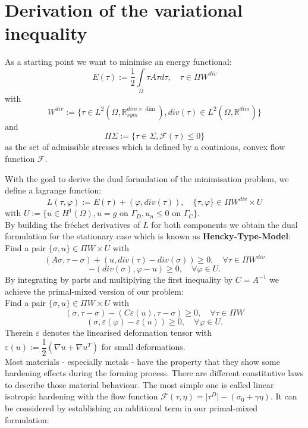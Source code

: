 \documentclass{article}
\begin{document}
\section{Derivation of the variational inequality}

As a starting point we want to minimise an energy functional:
$$E(\tau) := \dfrac{1}{2}\int\limits_{\Omega}\tau A \tau d\tau,\quad \tau\in \Pi W^{div}$$
with
$$W^{div}:=\lbrace \tau\in L^2(\Omega,\mathbb{R}^{dim\times\dim}_{sym}),div(\tau)\in L^2(\Omega,\mathbb{R}^{dim})\rbrace$$
and
$$\Pi \Sigma:=\lbrace \tau\in \Sigma, \mathcal{F}(\tau)\leq 0\rbrace$$
as the set of admissible stresses which is defined
by a continious, convex flow function $\mathcal{F}$.

With the goal to derive the dual formulation of the minimisation problem, we define a lagrange function:
$$L(\tau,\varphi) := E(\tau) + (\varphi, div(\tau)),\quad \lbrace\tau,\varphi\rbrace\in\Pi W^{div}\times U$$
with $U := \lbrace u\in H^1(\Omega), u = g \text{ on } \Gamma_D,u_n\leq 0 \text{ on } \Gamma_C \rbrace$.\\
By building the fr\'echet derivatives of $L$ for both components we obtain the dual formulation for the stationary case
which is known as \textbf{Hencky-Type-Model}:\\
Find a pair $\lbrace\sigma,u\rbrace\in \Pi W\times U$ with
$$\left(A\sigma,\tau - \sigma\right) + \left(u, div(\tau) - div(\sigma)\right) \geq 0,\quad \forall \tau\in \Pi W^{div}$$
$$-\left(div(\sigma),\varphi - u\right) \geq 0,\quad \forall \varphi\in U.$$
By integrating by parts and multiplying the first inequality by $C=A^{-1}$  we achieve the primal-mixed version of our problem:\\
Find a pair $\lbrace\sigma,u\rbrace\in \Pi W\times U$ with
$$\left(\sigma,\tau - \sigma\right) - \left(C\varepsilon(u), \tau - \sigma\right) \geq 0,\quad \forall \tau\in \Pi W$$
$$\left(\sigma,\varepsilon(\varphi) - \varepsilon(u)\right) \geq 0,\quad \forall \varphi\in U.$$
Therein $\varepsilon$ denotes the linearised deformation tensor with $\varepsilon(u) := \dfrac{1}{2}\left(\nabla u + \nabla u^T\right)$ for small deformations.\\
Most materials - especially metals - have the property that they show some hardening effects during the forming process.
There are different constitutive laws to describe those material behaviour. The most simple one is called linear isotropic hardening
with the flow function $\mathcal{F}(\tau,\eta) = \vert\tau^D\vert - (\sigma_0 + \gamma\eta)$.
It can be considered by establishing an additional term in our primal-mixed formulation:\\
\end{document}
